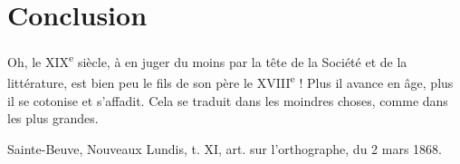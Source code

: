 \documentclass[french,twoside]{book} %
\newenvironment{quoteblock}%
  {\begin{quoting}}
  {\end{quoting}}
\newcommand\chapteropen{} %
\newcommand\chaptercont{} %
\newenvironment{quotebar}{%
    \def\FrameCommand{{\color{rubric!10!}\vrule width 0.5em} \hspace{0.9em}}%
    \def\OuterFrameSep{\itemsep} %
    \MakeFramed {\advance\hsize-\width \FrameRestore}
  }%
  {%
    \endMakeFramed
  }
\renewenvironment{quoteblock}%
  {%
    \savenotes
    \setstretch{0.9}
    \begin{quotebar}
  }
  {%
    \end{quotebar}
    \spewnotes
  }
\renewcommand\chapteropen{} %
\renewcommand\chaptercont{} %
\begin{document}
\chapteropen
\chapter[Conclusion]{Conclusion}

\chaptercont

\begin{quoteblock}
\noindent Oh, le XIX\textsuperscript{e} siècle, à en juger du moins par la tête de la Société et de la littérature, est bien peu le fils de son père le XVIII\textsuperscript{e} ! Plus il avance en âge, plus il se cotonise et s’affadit. Cela se traduit dans les moindres choses, comme dans les plus grandes.
\par
\par
{\citbibl Sainte-Beuve, Nouveaux Lundis, t. XI, art. sur l’orthographe, du 2 mars 1868.}
\end{quoteblock}
\end{document}
